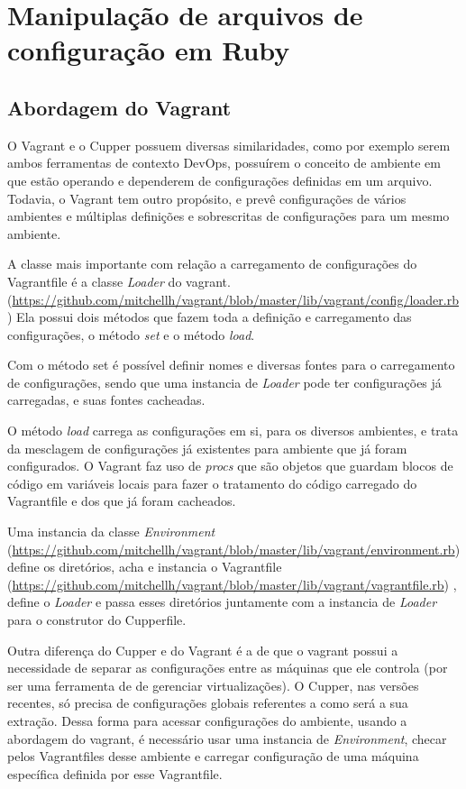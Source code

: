 \chapter{Manipulação de arquivos de configuração em Ruby}
\label{apc:conf-file}

\section{Abordagem do Vagrant}
O Vagrant e o Cupper possuem diversas similaridades, como por exemplo serem ambos
ferramentas de contexto DevOps, possuírem o conceito de ambiente em que estão operando
e dependerem de configurações definidas em um arquivo. Todavia, o Vagrant tem
outro propósito, e prevê configurações de vários ambientes e múltiplas definições e sobrescritas
de configurações para um mesmo ambiente.

A classe mais importante com relação a carregamento de configurações do Vagrantfile
é a classe \textit{Loader} do vagrant.
(\url{https://github.com/mitchellh/vagrant/blob/master/lib/vagrant/config/loader.rb})
Ela possui dois métodos que fazem toda a definição e carregamento das configurações, 
o método \textit{set} e o método \textit{load}. 

Com o método set é possível definir nomes e diversas fontes para o 
carregamento de configurações, sendo que uma instancia de \textit{Loader} 
pode ter configurações já carregadas, e suas fontes cacheadas.

O método \textit{load} carrega as configurações em si, para os diversos ambientes,
e trata da mesclagem de configurações já existentes para ambiente que já foram
configurados. O Vagrant faz uso de \textit{procs} que são objetos que guardam
blocos de código em variáveis locais para fazer o tratamento do código carregado
do Vagrantfile e dos que já foram cacheados.

Uma instancia da classe \textit{Environment} 
(\url{https://github.com/mitchellh/vagrant/blob/master/lib/vagrant/environment.rb})
define os diretórios, acha e instancia o Vagrantfile
(\url{https://github.com/mitchellh/vagrant/blob/master/lib/vagrant/vagrantfile.rb})
, define o \textit{Loader} e passa esses diretórios juntamente com a instancia de \textit{Loader} para o construtor do Cupperfile.

Outra diferença do Cupper e do Vagrant é a de que o vagrant possui a necessidade
de separar as configurações entre as máquinas que ele controla (por ser uma
ferramenta de de gerenciar virtualizações). O Cupper, nas versões recentes, só precisa de
configurações globais referentes a como será a sua extração. Dessa forma para
acessar configurações do ambiente, usando a abordagem do vagrant, é necessário
usar uma instancia de \textit{Environment}, checar pelos Vagrantfiles desse ambiente
e carregar configuração de uma máquina específica definida por esse Vagrantfile.

